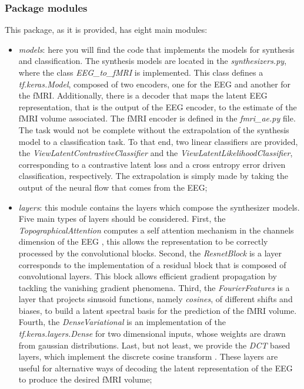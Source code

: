 \subsubsection{Package modules}\label{section:modules}

This package, as it is provided, has eight main modules:
\begin{itemize}
    \item \textit{models}: here you will find the code that implements the models for synthesis and classification. The synthesis models are located in the \textit{synthesizers.py}, where the class \textit{EEG\_to\_fMRI} is implemented. This class defines a \textit{tf.keras.Model}, composed of two encoders, one for the EEG and another for the fMRI. Additionally, there is a decoder that maps the latent EEG representation, that is the output of the EEG encoder, to the estimate of the fMRI volume associated. The fMRI encoder is defined in the \textit{fmri\_ae.py} file. The task would not be complete without the extrapolation of the synthesis model to a classification task. To that end, two linear classifiers are provided, the \textit{ViewLatentContrastiveClassifier} and the \textit{ViewLatentLikelihoodClassifier}, corresponding to a contrastive latent loss and a cross entropy error driven classification, respectively. The extrapolation is simply made by taking the output of the neural flow that comes from the EEG;
    \item \textit{layers}: this module contains the layers which compose the synthesizer models. Five main types of layers should be considered. First, the \textit{TopographicalAttention} computes a self attention mechanism in the channels dimension of the EEG \cite{calhas2022eeg}, this allows the representation to be correctly processed by the convolutional blocks. Second, the \textit{ResnetBlock} \cite{he2016deep} is a layer corresponds to the implementation of a residual block that is composed of convolutional layers. This block allows efficient gradient propagation by tackling the vanishing gradient phenomena. Third, the \textit{FourierFeatures} is a layer that projects sinusoid functions, namely \textit{cosines}, of different shifts and biases, to build a latent spectral basis for the prediction of the fMRI volume. Fourth, the \textit{DenseVariational} is an implementation of the \textit{tf.keras.layers.Dense} for two dimensional inputs, whose weights are drawn from gaussian distributions. Last, but not least, we provide the \textit{DCT} based layers, which implement the discrete cosine transform \cite{ahmed1974discrete}. These layers are useful for alternative ways of decoding the latent representation of the EEG to produce the desired fMRI volume;

\end{itemize}

